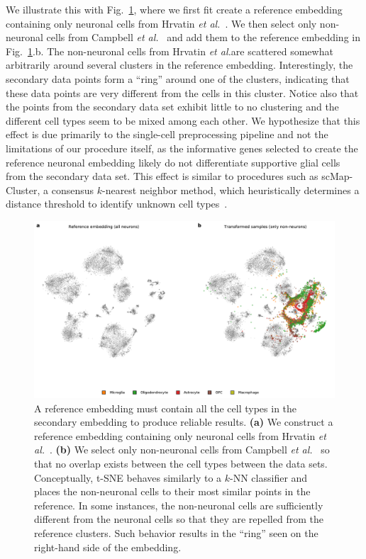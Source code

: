 \documentclass[runningheads]{llncs}
\newcommand{\etal}{\textit{et al.}}
\begin{document}
We illustrate this with Fig.~\ref{fig:incomplete_reference}, where we first fit
create a reference embedding containing only neuronal cells from Hrvatin
\etal~\cite{Hrvatin2018}. We then select only non-neuronal cells from Campbell
\etal~\cite{Campbell2017} and add them to the reference embedding in Fig.~\ref{fig:incomplete_reference}.b. The non-neuronal cells from Hrvatin \etal are
scattered somewhat arbitrarily around several clusters in the reference
embedding. Interestingly, the secondary data points form a ``ring'' around
one of the clusters, indicating that these data points are very different
from the cells in this cluster. Notice also that the points from the
secondary data set exhibit little to no clustering and the different cell
types seem to be mixed among each other. We hypothesize that this effect is
due primarily to the single-cell preprocessing pipeline and not the
limitations of our procedure itself, as the informative genes selected to
create the reference neuronal embedding likely do not differentiate
supportive glial cells from the secondary data set. This effect is similar
to procedures such as scMap-Cluster, a consensus $k$-nearest neighbor 
method, which heuristically determines a distance threshold to identify
unknown cell types~\cite{Kiselev2018}.


\begin{figure}[htb]
  \includegraphics[width=\textwidth]{incomplete_reference-brain.pdf}
  \caption{A reference embedding must contain all the cell types in the secondary embedding to produce reliable results. {\bf (a)} We construct a reference embedding containing only neuronal cells from Hrvatin \etal~\cite{Hrvatin2018}. {\bf (b)} We select only non-neuronal cells from Campbell \etal~\cite{Campbell2017} so that no overlap exists between the cell types between the data sets. Conceptually, t-SNE behaves similarly to a $k$-NN classifier and places the non-neuronal cells to their most similar points in the reference. In some instances, the non-neuronal cells are sufficiently different from the neuronal cells so that they are repelled from the reference clusters. Such behavior results in the ``ring'' seen on the right-hand side of the embedding.} \label{fig:incomplete_reference}
\end{figure}
\end{document}
